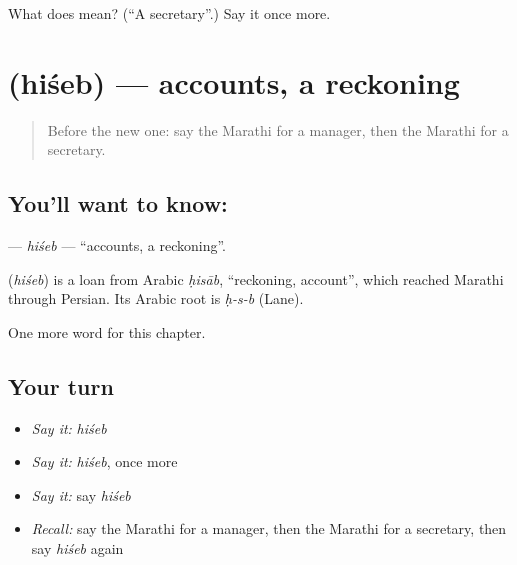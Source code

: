 \begin{tcolorbox}[breakable,colback=teal!4,colframe=teal!35!black,title={Before you move on}]
What does  mean? (\textquotedblleft{}A secretary\textquotedblright{}.) Say it once more.
\end{tcolorbox}
\section[\texorpdfstring{\mr{हिशेब} (hiśeb)}{हिशेब (hiśeb)}]{ (hiśeb) — accounts, a reckoning}

\label{lesson:MR-C191-hiseb}



\begin{quote}
Before the new one: say the Marathi for a manager, then the Marathi for a secretary.
\end{quote}

\subsection*{You'll want to know: }
\textbf{} — \emph{hiśeb} — \textquotedblleft{}accounts, a reckoning\textquotedblright{}.

\begin{cousinweb}
\textbf{} (\emph{hiśeb}) is a loan from Arabic \emph{ḥisāb}, \textquotedblleft{}reckoning, account\textquotedblright{}, which reached Marathi through Persian. Its Arabic root is \emph{ḥ-s-b} (Lane).
\end{cousinweb}

\begin{grammarlens}[title={What you've built}]
One more word for this chapter.
\end{grammarlens}

\subsection*{Your turn}
\begin{itemize}
\raggedright
  \item \emph{Say it:} \emph{hiśeb}
  \item \emph{Say it:} \emph{hiśeb}, once more
  \item \emph{Say it:} say \emph{hiśeb}
  \item \emph{Recall:} say the Marathi for a manager, then the Marathi for a secretary, then say \emph{hiśeb} again
\end{itemize}

